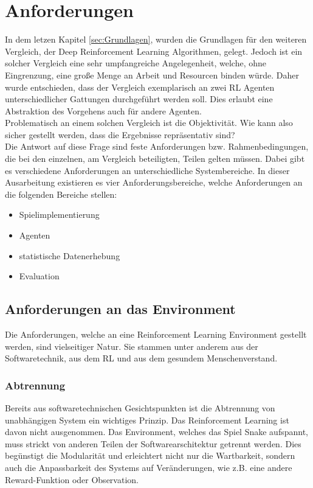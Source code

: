 \chapter{Anforderungen}
In dem letzen Kapitel \ref{sec:Grundlagen}, wurden die Grundlagen für den weiteren Vergleich, der Deep Reinforcement Learning Algorithmen, gelegt. Jedoch ist ein solcher Vergleich eine sehr umpfangreiche Angelegenheit, welche, ohne Eingrenzung, eine große Menge an Arbeit und Resourcen binden würde. Daher wurde entschieden, dass der Vergleich exemplarisch an zwei RL Agenten unterschiedlicher Gattungen durchgeführt werden soll. Dies erlaubt eine Abstraktion des Vorgehens auch für andere Agenten.\\
Problematisch an einem solchen Vergleich ist die Objektivität. Wie kann also sicher gestellt werden, dass die Ergebnisse repräsentativ sind?\\
Die Antwort auf diese Frage sind feste Anforderungen bzw. Rahmenbedingungen, die bei den einzelnen, am Vergleich beteiligten, Teilen gelten müssen.
Dabei gibt es verschiedene Anforderungen an unterschiedliche Systembereiche. 
In dieser Ausarbeitung existieren es vier Anforderungsbereiche, welche Anforderungen an die folgenden Bereiche stellen:
\begin{itemize}
	\item Spielimplementierung
	\item Agenten
	\item statistische Datenerhebung
	\item Evaluation
\end{itemize}

\section{Anforderungen an das Environment}
Die Anforderungen, welche an eine Reinforcement Learning Environment gestellt werden, sind vielseitiger Natur. Sie stammen unter anderem aus der Softwaretechnik, aus dem RL und aus dem gesundem Menschenverstand.

\subsection{Abtrennung}
Bereits aus softwaretechnischen Gesichtspunkten ist die Abtrennung von unabhängigen System ein wichtiges Prinzip. Das Reinforcement Learning ist davon nicht ausgenommen. Das Environment, welches das Spiel Snake aufspannt, muss strickt von anderen Teilen der Softwarearschitektur getrennt werden. Dies begünstigt die Modularität und erleichtert nicht nur die Wartbarkeit, sondern auch die Anpassbarkeit des Systems auf Veränderungen, wie z.B. eine andere Reward-Funktion oder Observation.

